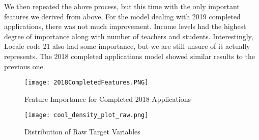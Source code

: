 \documentclass[12pt]{article}
\begin{document}
We then repeated the above process, but this time with the only important features we derived from above. For the model dealing with 2019 completed applications, there was not much improvement. Income levels had the highest degree of importance along with number of teachers and students. Interestingly, Locale code 21 also had some importance, but we are still unsure of it actually represents. The 2018 completed applications model showed similar results to the previous one.

\begin{figure}[!htb]
  \centering
  \texttt{[image: 2018CompletedFeatures.PNG]}
  \caption{Feature Importance for Completed 2018 Applications}
  \label{fig:feature_importance}
\end{figure}

\begin{figure}[!htb]
  \centering
  \texttt{[image: cool\_density\_plot\_raw.png]}
  \caption{Distribution of Raw Target Variables}
  \label{fig:target_raw}
\end{figure}




\printbibliography
%   


\end{document}
